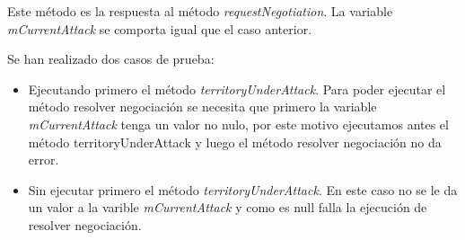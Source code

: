 Este método es la respuesta al método \textit{requestNegotiation}. La variable \textit{mCurrentAttack} se comporta igual que el caso anterior.

Se han realizado dos casos de prueba:
\begin{itemize}
\item Ejecutando primero el método \textit{territoryUnderAttack}. Para poder ejecutar el método resolver negociación se necesita que primero la variable \textit{mCurrentAttack} tenga un valor no nulo, por este motivo ejecutamos antes el método territoryUnderAttack y luego el método resolver negociación no da error.
\item Sin ejecutar primero el método \textit{territoryUnderAttack}. En este caso no se le da un valor a la varible \textit{mCurrentAttack} y como es null falla la ejecución de resolver negociación.
\end{itemize}